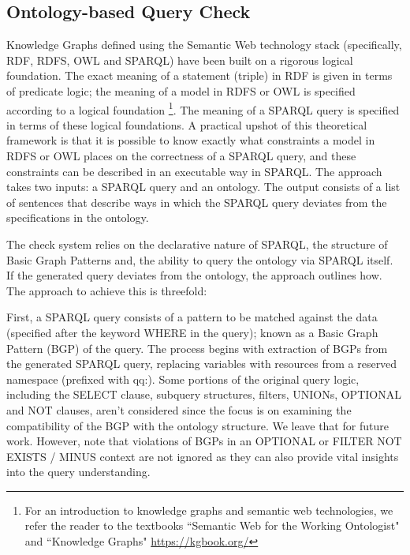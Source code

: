 \documentclass[11pt]{article}
\begin{document}



\subsection{Ontology-based Query Check}
Knowledge Graphs defined using the Semantic Web technology stack (specifically, RDF, RDFS, OWL and SPARQL) have been built on a rigorous logical foundation. 
The exact meaning of a statement (triple) in RDF is given in terms of predicate logic; the meaning of a model in RDFS or OWL is specified according to a logical foundation \cite{10.1145/3382097,DBLP:journals/csur/HoganBCdMGKGNNN21,DBLP:series/synthesis/2021Hogan}\footnote{For an introduction to knowledge graphs and semantic web technologies, we refer the reader to the textbooks ``Semantic Web for the Working Ontologist" and ``Knowledge Graphs" \url{https://kgbook.org/} }. 
The meaning of a SPARQL query is specified in terms of these logical foundations. 
A practical upshot of this theoretical framework is that it is possible to know exactly what constraints a model in RDFS or OWL places on the correctness of a SPARQL query, and these constraints can be described in an executable way in SPARQL. 
The approach takes two inputs: a SPARQL query and an ontology. 
The output consists of a list of sentences that describe ways in which the SPARQL query deviates from the specifications in the ontology. 

The check system relies on the declarative nature of SPARQL, the structure of Basic Graph Patterns and, the ability to query the ontology via SPARQL itself. 
If the generated query deviates from the ontology, the approach outlines how.
The approach to achieve this is threefold:

First, a SPARQL query consists of a pattern to be matched against the data (specified after the keyword WHERE in the query); known as a Basic Graph Pattern (BGP) of the query. 
The process begins with extraction of BGPs from the generated SPARQL query, replacing variables with resources from a reserved namespace (prefixed with qq:). Some portions of the original query logic, including the SELECT clause, subquery structures, filters, UNIONs, OPTIONAL and NOT clauses, aren't considered since the focus is on examining the compatibility of the BGP with the ontology structure. We leave that for future work. 
However, note that violations of BGPs in an OPTIONAL or FILTER NOT EXISTS / MINUS context are not ignored as they can also provide vital insights into the query understanding.
\end{document}

